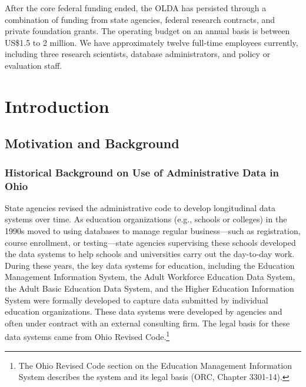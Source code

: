After the core federal funding ended, the OLDA has persisted through a combination of funding from state agencies, federal research contracts, and private foundation grants. The operating budget on an annual basis is between US\$1.5 to 2 million. We have approximately twelve full-time employees currently, including three research scientists, database administrators, and policy or evaluation staff.

\hypertarget{introduction-3}{%
\section{Introduction}\label{introduction-3}}

\hypertarget{motivation-and-background-1}{%
\subsection{Motivation and Background}\label{motivation-and-background-1}}

\hypertarget{historical-background-on-use-of-administrative-data-in-ohio}{%
\subsubsection*{Historical Background on Use of Administrative Data in Ohio}\label{historical-background-on-use-of-administrative-data-in-ohio}}

State agencies revised the administrative code to develop longitudinal data systems over time. As education organizations (e.g., schools or colleges) in the 1990s moved to using databases to manage regular business---such as registration, course enrollment, or testing---state agencies supervising these schools developed the data systems to help schools and universities carry out the day-to-day work. During these years, the key data systems for education, including the Education Management Information System, the Adult Workforce Education Data System, the Adult Basic Education Data System, and the Higher Education Information System were formally developed to capture data submitted by individual education organizations. These data systems were developed by agencies and often under contract with an external consulting firm. The legal basis for these data systems came from Ohio Revised Code.\footnote{The Ohio Revised Code section on the Education Management Information System describes the system and its legal basis (ORC, Chapter 3301-14).}

